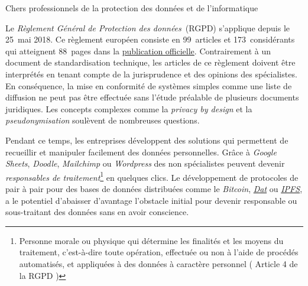 \documentclass{scrlttr2}
\begin{document}



\begin{letter}{}
\opening{Chers professionnels de la protection des données et de
l'informatique}

Le \emph{Règlement Général de Protection des données}~(RGPD) s'applique
depuis le 25~mai 2018. Ce règlement européen consiste en 99~articles et
173~considérants qui atteignent 88~pages dans la
\href{http://eur-lex.europa.eu/legal-content/EN/TXT/?uri=uriserv:OJ.L_.2016.119.01.0001.01.ENG}{publication
officielle}. Contrairement à un document de standardisation technique,
les articles de ce règlement doivent être interprétés en tenant compte
de la jurisprudence et des opinions des spécialistes. En conséquence, la
mise en conformité de systèmes simples comme une liste de diffusion ne
peut pas être effectuée sans l'étude préalable de plusieurs documents
juridiques. Les concepts complexes comme la \emph{privacy by design} et
la \emph{pseudonymisation} soulèvent de nombreuses questions.

Pendant ce temps, les entreprises développent des solutions qui
permettent de recueillir et manipuler facilement des données
personnelles. Grâce à \emph{Google Sheets}, \emph{Doodle},
\emph{Mailchimp} ou \emph{Wordpress} des non spécialistes peuvent
devenir \emph{responsables de traitement}\footnote{Personne morale ou
  physique qui détermine les finalités et les moyens du traitement,
  c'est-à-dire toute opération, effectuée ou non à l'aide de procédés
  automatisés, et appliquées à des données à caractère personnel (
  Article 4 de la RGPD )} en quelques clics. Le développement de
protocoles de pair à pair pour des bases de données distribuées comme le
\emph{Bitcoin}, \emph{\href{https://datproject.org/}{Dat}} ou
\emph{\href{https://ipfs.io/}{IPFS}}, a le potentiel d'abaisser
d'avantage l'obstacle initial pour devenir responsable ou sous-traitant
des données sans en avoir conscience.


\end{letter}
\end{document}
